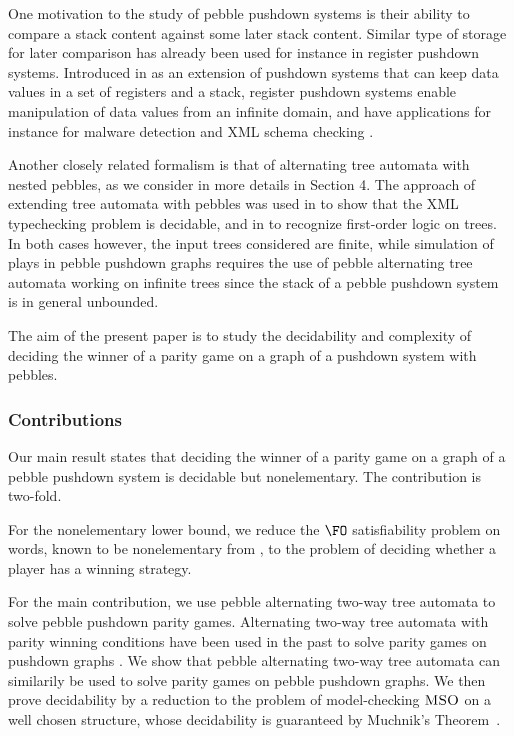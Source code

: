 \documentclass[a4paper,UKenglish,cleveref, autoref, thm-restate]{lipics-v2021}
\newcommand{\MSO}{\textsc{MSO}}
\begin{document}
One motivation to the study of pebble pushdown systems is their ability to compare a stack content against some later stack content.
Similar type of storage for later comparison has already been used for instance
in register pushdown systems. Introduced in \cite{murawski2017reachability}
 as an extension of pushdown systems that 
 can keep data values in
 a set of registers and a stack,
register pushdown systems
enable
manipulation of
data values from an infinite domain,
and have applications for instance for
malware detection and XML schema
checking \cite{senda2021forward, senda2021ltl}.





Another closely related formalism is that of alternating tree automata with nested pebbles, as we 
consider in more details in Section 4. The approach of extending tree automata with pebbles was used in \cite{milo2000typechecking} to show that the XML typechecking problem is decidable, and in \cite{karhumaki2012jewels} to recognize first-order logic on trees. In both cases however, the input trees considered are finite, while 
simulation of plays in pebble pushdown graphs
requires the use of pebble alternating tree automata working on infinite trees
since the stack of a pebble pushdown system is in general unbounded.






The aim of the present paper is to study the decidability and complexity of
deciding
the winner of a parity game on a graph of a pushdown system with  
pebbles.




\subsubsection*{Contributions}


Our main result states that
deciding
the winner of a parity game on a graph of a pebble pushdown system
is decidable but nonelementary.
The contribution is two-fold. 




	For the nonelementary lower bound,
we reduce the $\FO$ satisfiability problem on words, known to be nonelementary
from \cite{Sto74}, to the
problem of deciding whether a player has a winning strategy. 

	For the main contribution, we use pebble alternating two-way tree automata to solve pebble pushdown parity games.
Alternating two-way tree automata with parity winning conditions have been used in the past to solve parity games on pushdown graphs \cite{cachat2002two}. We show that pebble alternating two-way tree automata can similarily be used to solve parity games on pebble pushdown graphs.
We then prove  decidability 
by 
a reduction
 to the problem of model-checking $\MSO$ on a well chosen structure, whose decidability is
 guaranteed by
Muchnik's Theorem~\cite{Wal96}.
\end{document}
